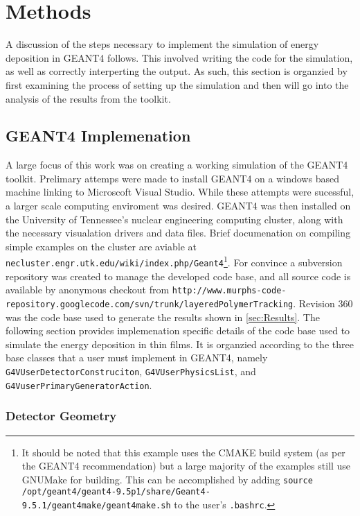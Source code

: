 \section{Methods}
\label{sec:Methods}

A discussion of the steps necessary to implement the simulation of energy deposition in GEANT4 follows.
This involved writing the code for the simulation, as well as correctly interperting the output.
As such, this section is organzied by first examining the process of setting up the simulation and then will go into the analysis of the results from the toolkit.
\subsection{GEANT4 Implemenation}

A large focus of this work was on creating a working simulation of the GEANT4 toolkit.
Prelimary attemps were made to install GEANT4 on a windows based machine linking to Microscoft Visual Studio. While these attempts were sucessful, a larger scale computing enviroment was desired.
GEANT4 was then installed on the University of Tennessee's nuclear engineering computing cluster, along with the necessary visualation drivers and data files.
Brief documenation on compiling simple examples on the cluster are aviable at \texttt{necluster.engr.utk.edu/wiki/index.php/Geant4}\footnote{It should be noted that this example uses the CMAKE build system (as per the GEANT4 recommendation) but a large majority of the examples still use GNUMake for building. This can be accomplished by adding \verb+source /opt/geant4/geant4-9.5p1/share/Geant4-9.5.1/geant4make/geant4make.sh+ to the user's \verb+.bashrc+.}. 
For convince a subversion repository was created to manage the developed code base, and all source code is available by anonymous checkout from \texttt{http://www.murphs-code-repository.googlecode.com/svn/trunk/layeredPolymerTracking}. Revision 360 was the code base used to generate the results shown in \ref{sec:Results}.
The following section provides implemenation specific details of the code base used to simulate the energy deposition in thin films.
It is organzied according to the three base classes that a user must implement in GEANT4, namely \verb+G4VUserDetectorConstruciton+, \verb+G4VUserPhysicsList+, and \verb+G4VuserPrimaryGeneratorAction+.
\subsubsection{Detector Geometry}

